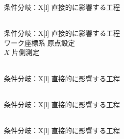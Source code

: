 \clearpage

\begin{multicollongtblr}{条件分岐：\PMKeywayCornerType}{X[l]}
直接的に影響する工程\\
\KeywayMilling\\
\end{multicollongtblr}

\begin{multicollongtblr}{条件分岐：\PMAKDToleranceExists}{X[l]}
直接的に影響する工程\\
ワーク座標系 原点設定\\
\KeywayCenter$X$ 片側測定\\
\KeywayMilling\\
\end{multicollongtblr}




\begin{multicollongtblr}{条件分岐：\PMDimpleExists}{X[l]}
直接的に影響する工程\\
\DimpleMilling\\
\end{multicollongtblr}




\begin{multicollongtblr}{条件分岐：\PMEndFaceOutChamferType}{X[l]}
直接的に影響する工程\\
\EndFaceOutChamferMilling\\
\end{multicollongtblr}

\begin{multicollongtblr}{条件分岐：\PMEndFaceInChamferType}{X[l]}
直接的に影響する工程\\
\EndFaceInChamferMilling\\
\end{multicollongtblr}



